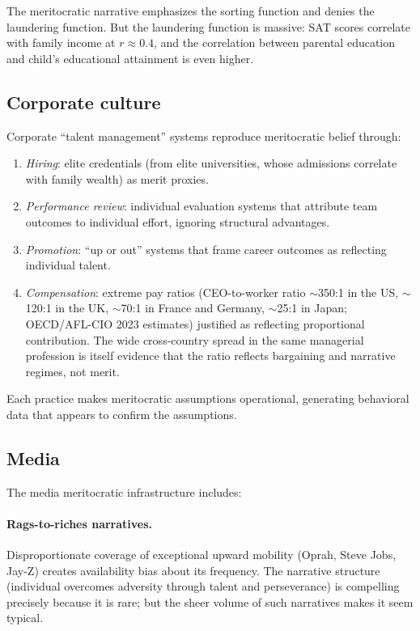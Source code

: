 The meritocratic narrative emphasizes the sorting function and denies the laundering function.
But the laundering function is massive: SAT scores correlate with family income at $r \approx 0.4$, and the correlation between parental education and child's educational attainment is even higher.

\subsection{Corporate culture}

\begin{model}
\label{mod:corporate-meritocracy}
Corporate ``talent management'' systems reproduce meritocratic belief through:
\begin{enumerate}[nosep]
  \item \emph{Hiring}: elite credentials (from elite universities, whose admissions correlate with family wealth) as merit proxies.
  \item \emph{Performance review}: individual evaluation systems that attribute team outcomes to individual effort, ignoring structural advantages.
  \item \emph{Promotion}: ``up or out'' systems that frame career outcomes as reflecting individual talent.
  \item \emph{Compensation}: extreme pay ratios (CEO-to-worker ratio $\sim$350:1 in the US, $\sim$120:1 in the UK, $\sim$70:1 in France and Germany, $\sim$25:1 in Japan; OECD/AFL-CIO 2023 estimates) justified as reflecting proportional contribution. The wide cross-country spread in the same managerial profession is itself evidence that the ratio reflects bargaining and narrative regimes, not merit.
\end{enumerate}
Each practice makes meritocratic assumptions operational, generating behavioral data that appears to confirm the assumptions.
\end{model}

\subsection{Media}

The media meritocratic infrastructure includes:

\paragraph{Rags-to-riches narratives.}
Disproportionate coverage of exceptional upward mobility (Oprah, Steve Jobs, Jay-Z) creates availability bias about its frequency.
The narrative structure (individual overcomes adversity through talent and perseverance) is compelling precisely because it is rare; but the sheer volume of such narratives makes it seem typical.


